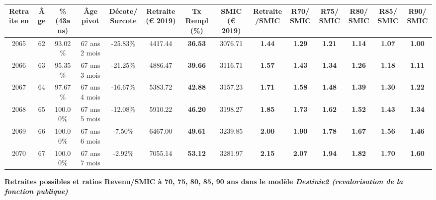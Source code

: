 \begin{adjustbox}{max width=\textwidth} 
\begin{tabular}[htb]{|c|c||c|c|c||c|c||c|c||c|c|c|c|c|} 
\hline 
 Retraite en &  Âge &  \%(43ans) &  Âge pivot &  Décote/Surcote &  Retraite (\euro{} 2019) &  Tx Rempl(\%) &  SMIC (\euro{} 2019) &  Retraite/SMIC &  R70/SMIC &  R75/SMIC &  R80/SMIC &  R85/SMIC &  R90/SMIC \\ 
\hline \hline 
 2065 &  62 &  93.02\% &  67 ans 2 mois &  -25.83\% &  4417.44 &  {\bf 36.53} &  3076.71 &  {\bf 1.44} &  {\bf 1.29} &  {\bf 1.21} &  {\bf 1.14} &  {\bf 1.07} &  {\bf 1.00} \\ 
\hline 
 2066 &  63 &  95.35\% &  67 ans 3 mois &  -21.25\% &  4886.47 &  {\bf 39.66} &  3116.71 &  {\bf 1.57} &  {\bf 1.43} &  {\bf 1.34} &  {\bf 1.26} &  {\bf 1.18} &  {\bf 1.11} \\ 
\hline 
 2067 &  64 &  97.67\% &  67 ans 4 mois &  -16.67\% &  5383.72 &  {\bf 42.88} &  3157.23 &  {\bf 1.71} &  {\bf 1.58} &  {\bf 1.48} &  {\bf 1.39} &  {\bf 1.30} &  {\bf 1.22} \\ 
\hline 
 2068 &  65 &  100.00\% &  67 ans 5 mois &  -12.08\% &  5910.22 &  {\bf 46.20} &  3198.27 &  {\bf 1.85} &  {\bf 1.73} &  {\bf 1.62} &  {\bf 1.52} &  {\bf 1.43} &  {\bf 1.34} \\ 
\hline 
 2069 &  66 &  100.00\% &  67 ans 6 mois &  -7.50\% &  6467.00 &  {\bf 49.61} &  3239.85 &  {\bf 2.00} &  {\bf 1.90} &  {\bf 1.78} &  {\bf 1.67} &  {\bf 1.56} &  {\bf 1.46} \\ 
\hline 
 2070 &  67 &  100.00\% &  67 ans 7 mois &  -2.92\% &  7055.14 &  {\bf 53.12} &  3281.97 &  {\bf 2.15} &  {\bf 2.07} &  {\bf 1.94} &  {\bf 1.82} &  {\bf 1.70} &  {\bf 1.60} \\ 
\hline 
\hline 
\end{tabular} 
\end{adjustbox} 
 
 \vspace{0.1cm} 
{\bf \noindent Retraites possibles et ratios Revenu/SMIC à 70, 75, 80, 85, 90 ans dans le modèle \emph{Destinie2 (revalorisation de la fonction publique)}}  
 

